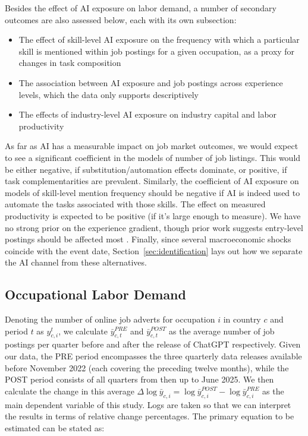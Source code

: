 \documentclass[11pt]{article}
\begin{document}
Besides the effect of AI exposure on labor demand, a number of secondary outcomes are also assessed below, each with its own subsection:

\begin{itemize}
    \item The effect of skill-level AI exposure on the frequency with which a particular skill is mentioned within job postings for a given occupation, as a proxy for changes in task composition
    \item The association between AI exposure and job postings across experience levels, which the data only supports descriptively
    \item The effects of industry-level AI exposure on industry capital and labor productivity
\end{itemize}

As far as AI has a measurable impact on job market outcomes, we would expect to see a significant coefficient in the models of number of job listings. This would be either negative, if substitution/automation effects dominate, or positive, if task complementarities are prevalent. Similarly, the coefficient of AI exposure on models of skill-level mention frequency should be negative if AI is indeed used to automate the tasks associated with those skills. The effect on measured productivity is expected to be positive (if it's large enough to measure). We have no strong prior on the experience gradient, though prior work suggests entry-level postings should be affected most \citep{brynjolfsson2025canaries}. Finally, since several macroeconomic shocks coincide with the event date, Section~\ref{sec:identification} lays out how we separate the AI channel from these alternatives.

\subsection{Occupational Labor Demand}

Denoting the number of online job adverts for occupation $i$ in country $c$ and period $t$ as $y_{c,i}^{t}$, we calculate $\bar{y}_{c,t}^{PRE}$ and $\bar{y}_{c,t}^{POST}$ as the average number of job postings per quarter before and after the release of ChatGPT respectively. Given our data, the PRE period encompasses the three quarterly data releases available before November 2022 (each covering the preceding twelve months), while the POST period consists of all quarters from then up to June 2025. We then calculate the change in this average  $\Delta\log{\bar{y}}_{c,i} = \log{\bar{y}^{POST}_{c,i}}-\log{\bar{y}^{PRE}_{c,i}}$ as the main dependent variable of this study. Logs are taken so that we can interpret the results in terms of relative change percentages. The primary equation to be estimated can be stated as:
\end{document}
